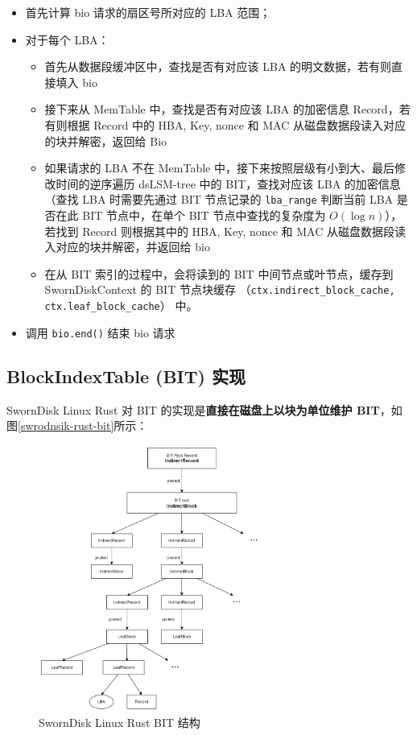 \begin{itemize}[itemsep=2pt,topsep=0pt,parsep=0pt]
  \item 首先计算 bio 请求的扇区号所对应的 LBA 范围；
  \item 对于每个 LBA：
  \begin{itemize}[itemsep=2pt,topsep=0pt,parsep=0pt]
    \item 首先从数据段缓冲区中，查找是否有对应该 LBA 的明文数据，若有则直接填入 bio
    \item 接下来从 MemTable 中，查找是否有对应该 LBA 的加密信息 Record，若有则根据 Record 中的 HBA, Key, nonce 和 MAC 从磁盘数据段读入对应的块并解密，返回给 Bio
    \item 如果请求的 LBA 不在 MemTable 中，接下来按照层级有小到大、最后修改时间的逆序遍历 dsLSM-tree 中的 BIT，查找对应该 LBA 的加密信息（查找 LBA 时需要先通过 BIT 节点记录的 \texttt{lba_range} 判断当前 LBA 是否在此 BIT 节点中，在单个 BIT 节点中查找的复杂度为 $O(\log n)$），若找到 Record 则根据其中的 HBA, Key, nonce 和 MAC 从磁盘数据段读入对应的块并解密，并返回给 bio
    \item 在从 BIT 索引的过程中，会将读到的 BIT 中间节点或叶节点，缓存到 SwornDiskContext 的 BIT 节点块缓存 （\texttt{ctx.indirect_block_cache, ctx.leaf_block_cache}） 中。
  \end{itemize}
  \item 调用 \texttt{bio.end()} 结束 bio 请求
\end{itemize}

\subsection{BlockIndexTable (BIT) 实现}

SwornDisk Linux Rust 对 BIT 的实现是\textbf{直接在磁盘上以块为单位维护 BIT}，如图\ref{swrodnsik-rust-bit}所示：

\begin{figure}[H]
  \includegraphics[width=0.8\textwidth]{images/bit-structure.jpg}
  \caption{SwornDisk Linux Rust BIT 结构}
  \label{sworndisk-rust-bit}
\end{figure}

